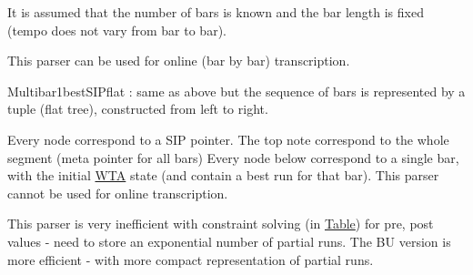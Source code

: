 It is assumed that the number of bars is known and the bar length is fixed (tempo does not vary from bar to bar).

This parser can be used for online (bar by bar) transcription.


\begin{DoxyItemize}
\item {\ttfamily Multibar1best\+S\+I\+Pflat} \+: same as above but the sequence of bars is represented by a tuple (flat tree), constructed from left to right.
\end{DoxyItemize}


\begin{DoxyCode}{0}
\DoxyCodeLine{ [bars 1-n]}
\DoxyCodeLine{  /      \(\backslash\)}
\end{DoxyCode}


Every node correspond to a S\+IP pointer. The top note correspond to the whole segment (meta pointer for all bars) Every node below correspond to a single bar, with the initial \mbox{\hyperlink{classWTA}{W\+TA}} state (and contain a best run for that bar). This parser cannot be used for online transcription.

This parser is very inefficient with constraint solving (in \mbox{\hyperlink{classTable}{Table}}) for pre, post values -\/ need to store an exponential number of partial runs. The BU version is more efficient -\/ with more compact representation of partial runs. 